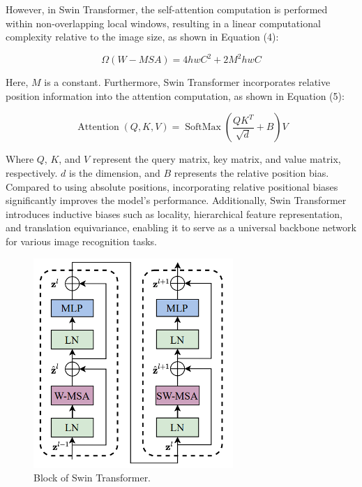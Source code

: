 \documentclass[10pt,twocolumn,letterpaper]{article}
\begin{document}
However, in Swin Transformer, the self-attention computation is performed within non-overlapping local windows, resulting in a linear computational complexity relative to the image size, as shown in Equation (4):

\begin{equation}
  \Omega(W-M S A)=4 h w C^2+2 M^2 h w C
\end{equation}

Here, $M$ is a constant.
Furthermore, Swin Transformer incorporates relative position information into the attention computation, as shown in Equation (5):

\begin{equation}
  \operatorname{Attention}(Q, K, V)=\operatorname{SoftMax}\left(\frac{Q K^T}{\sqrt{d}}+B\right) V
\end{equation}

Where $Q$, $K$, and $V$ represent the query matrix, key matrix, and value matrix, respectively. $d$ is the dimension, and $B$ represents the relative position bias. Compared to using absolute positions, incorporating relative positional biases significantly improves the model's performance.
Additionally, Swin Transformer introduces inductive biases such as locality, hierarchical feature representation, and translation equivariance, enabling it to serve as a universal backbone network for various image recognition tasks.

\begin{figure}[htbp]   %
	\centering
	\includegraphics[width=0.8\linewidth,scale=1.00]{Images/ST_2.png}
	\caption{Block of Swin Transformer.}
	\label{fig:st_2}
\end{figure}
\end{document}
